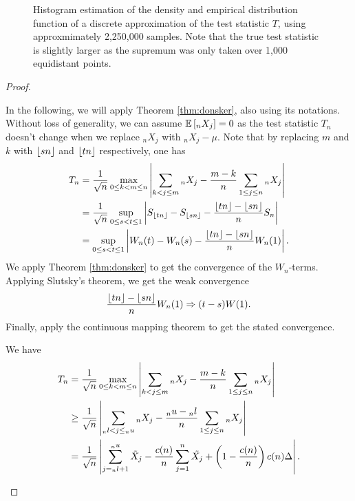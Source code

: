 \begin{figure}
    \centering
    \caption{Histogram estimation of the density and empirical distribution function of a discrete approximation of the test statistic $T$, using approxmimately 2,250,000 samples. Note that the true test statistic is slightly larger as the supremum was only taken over 1,000 equidistant points.}
\end{figure}

\begin{proof}
    \begin{aufzi}
        \item In the following, we will apply Theorem \ref{thm:donsker}, also using its notations. Without loss of generality, we can assume $\mathbb{E}\left[{}_{n}X_j\right] = 0$ as the test statistic $T_n$ doesn't change when we replace ${}_{n}X_j$ with ${}_{n}X_j - \mu$. Note that by replacing $m$ and $k$ with $\lfloor s n\rfloor$ and $\lfloor t n\rfloor$ respectively, one has
        \begin{align*}
            T_n 
            & = \frac{1}{\sqrt{n}} \max\limits_{0 \leq k < m \leq n} \left| \sum\limits_{k < j \leq m} {}_{n}X_j - \frac{m - k}{n} \sum\limits_{1 \leq j \leq n} {}_{n}X_j \right| \\
            & = \frac{1}{\sqrt{n}} \sup\limits_{0 \leq s < t \leq 1} \left| S_{\lfloor t n\rfloor} - S_{\lfloor s n\rfloor} - \frac{\lfloor t n\rfloor - \lfloor s n\rfloor}{n} S_{n} \right| \\
            & = \sup\limits_{0 \leq s < t \leq 1} \left| W_n(t) - W_n(s) - \frac{\lfloor t n\rfloor - \lfloor s n\rfloor}{n} W_n(1) \right|.
        \end{align*}
        We apply Theorem \ref{thm:donsker} to get the convergence of the $W_n$-terms. Applying Slutsky's theorem, we get the weak convergence
        \[ \frac{\lfloor tn\rfloor - \lfloor sn\rfloor}{n} W_n(1) \Rightarrow (t-s)W(1). \]
        Finally, apply the continuous mapping theorem to get the stated convergence.
        \item
        We have
        \begin{align*}
            T_n
            & = \frac{1}{\sqrt{n}} \max\limits_{0 \leq k < m \leq n} \left| \sum\limits_{k < j \leq m} {}_{n}X_j - \frac{m - k}{n} \sum\limits_{1 \leq j \leq n} {}_{n}X_j \right| \\
            & \geq \frac{1}{\sqrt{n}} \left| \sum\limits_{{}_{n}l < j \leq {}_{n}u} {}_{n}X_j - \frac{{}_{n}u - {}_{n}l}{n} \sum\limits_{1 \leq j \leq n} {}_{n}X_j \right| \\
            & = \frac{1}{\sqrt{n}} \left| \sum\limits_{j={}_{n}l+1}^{{}_{n}u} \Tilde{X}_j - \frac{c(n)}{n} \sum\limits_{j = 1}^{n} \Tilde{X_j} + \left( 1 - \frac{c(n)}{n} \right)c(n) \Delta \right|. \\

\end{align*}
\end{aufzi}
\end{proof}
